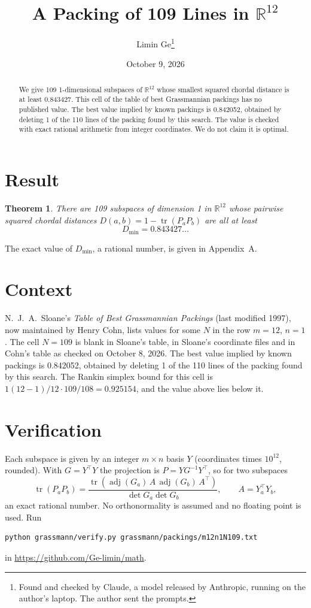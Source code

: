 \documentclass[11pt,a4paper]{article}
\title{A Packing of 109 Lines in $\mathbb{R}^{12}$}
\author{Limin Ge\thanks{Found and checked by Claude, a model released by Anthropic, running on the author's laptop. The author sent the prompts.}}
\date{October 9, 2026}
\newtheorem*{theorem}{Theorem}
\begin{document}
\maketitle
\begin{abstract}
We give 109 1-dimensional subspaces of $\mathbb{R}^{12}$ whose smallest squared chordal distance is at least 0.843427. This cell of the table of best Grassmannian packings has no published value. The best value implied by known packings is 0.842052, obtained by deleting 1 of the 110 lines of the packing found by this search. The value is checked with exact rational arithmetic from integer coordinates. We do not claim it is optimal.
\end{abstract}

\section{Result}
\begin{theorem}
There are 109 subspaces of dimension 1 in $\mathbb{R}^{12}$ whose pairwise squared chordal distances $D(a,b) = 1 - \operatorname{tr}(P_aP_b)$ are all at least
\[ D_{\min} = 0.843427\ldots \]
\end{theorem}
The exact value of $D_{\min}$, a rational number, is given in Appendix~A.


\section{Context}
N.~J.~A.~Sloane's \emph{Table of Best Grassmannian Packings} (last modified 1997), now maintained by Henry Cohn, lists values for some $N$ in the row $m=12$, $n=1$. The cell $N=109$ is blank in Sloane's table, in Sloane's coordinate files and in Cohn's table as checked on October 8, 2026. The best value implied by known packings is 0.842052, obtained by deleting 1 of the 110 lines of the packing found by this search. The Rankin simplex bound for this cell is $1(12-1)/12\cdot 109/108 = 0.925154$, and the value above lies below it.


\section{Verification}
Each subspace is given by an integer $m\times n$ basis $Y$ (coordinates times $10^{12}$, rounded). With $G=Y^\top Y$ the projection is $P=YG^{-1}Y^\top$, so for two subspaces
\[ \operatorname{tr}(P_aP_b)=\frac{\operatorname{tr}(\operatorname{adj}(G_a)\,A\,\operatorname{adj}(G_b)\,A^\top)}{\det G_a\det G_b},\qquad A=Y_a^\top Y_b, \]
an exact rational number. No orthonormality is assumed and no floating point is used. Run
\begin{verbatim}
python grassmann/verify.py grassmann/packings/m12n1N109.txt
\end{verbatim}
in \url{https://github.com/Ge-limin/math}.
\end{document}
